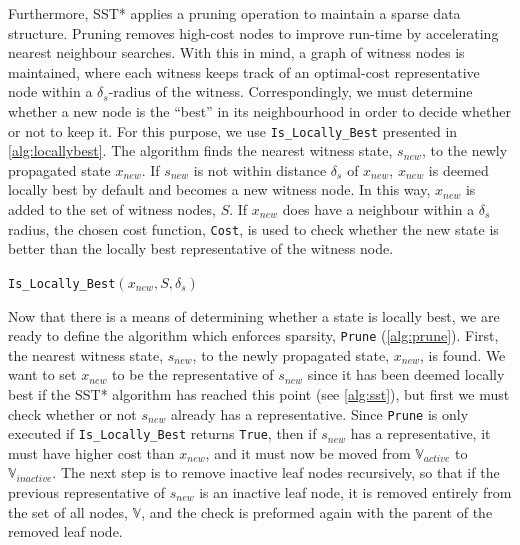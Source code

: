 Furthermore, SST* applies a pruning operation to maintain a sparse data structure. Pruning removes high-cost nodes to improve run-time by accelerating nearest neighbour searches. With this in mind, a graph of witness nodes is maintained, where each witness keeps track of an optimal-cost representative node within a $\delta_s$-radius of the witness. Correspondingly, we must determine whether a new node is the ``best'' in its neighbourhood in order to decide whether or not to keep it. For this purpose, we use \texttt{Is\_Locally\_Best} presented in \autoref{alg:locallybest}. The algorithm finds the nearest witness state, $s_{new}$, to the newly propagated state $x_{new}$. If $s_{new}$ is not within distance $\delta_s$ of $x_{new}$, $x_{new}$ is deemed locally best by default and becomes a new witness node. In this way, $x_{new}$ is added to the set of witness nodes, $S$. If $x_{new}$ does have a neighbour within a $\delta_s$ radius, the chosen cost function, \texttt{Cost}, is used to check whether the new state is better than the locally best representative of the witness node.

\begin{algorithm}
\caption{\texttt{Is\_Locally\_Best}$(x_{new}, S, \delta_s)$}
\label{alg:locallybest}
\begin{algorithmic}[1]
    \EndIf{}
    \EndIf{}
\end{algorithmic}{}
\end{algorithm}

Now that there is a means of determining whether a state is locally best, we are ready to define the algorithm which enforces sparsity, \texttt{Prune} (\autoref{alg:prune}). First, the nearest witness state, $s_{new}$, to the newly propagated state, $x_{new}$, is found. We want to set $x_{new}$ to be the representative of $s_{new}$ since it has been deemed locally best if the SST* algorithm has reached this point (see \autoref{alg:sst}), but first we must check whether or not $s_{new}$ already has a representative. Since \texttt{Prune} is only executed if \texttt{Is\_Locally\_Best} returns \texttt{True}, then if $s_{new}$ has a representative, it must have higher cost than $x_{new}$, and it must now be moved from $\mathbb{V}_{active}$ to $\mathbb{V}_{inactive}$. The next step is to remove inactive leaf nodes recursively, so that if the previous representative of $s_{new}$ is an inactive leaf node, it is removed entirely from the set of all nodes, $\mathbb{V}$, and the check is preformed again with the parent of the removed leaf node.


